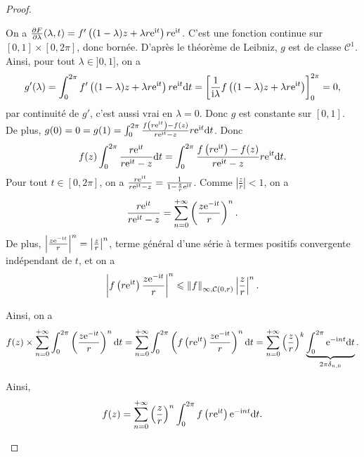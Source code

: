 \documentclass[12pt]{article}
\begin{document}
\begin{proof}
\begin{enumerate}
        On a $\frac{\partial F}{\partial \lambda}(\lambda,t)=f'\left((1-\lambda)z+\lambda r\mathrm{e}^{\mathrm{i} t}\right)r\mathrm{e}^{\mathrm{i} t}$. C'est une fonction continue sur $[0,1]\times[0,2\pi]$, donc bornée. D'après le théorème de Leibniz, $g$ est de classe $\mathcal{C}^{1}$. Ainsi, pour tout $\lambda\in]0,1]$, on a 
        \begin{equation}
            g'(\lambda)=\int_{0}^{2\pi}f'\left((1-\lambda)z+\lambda r\mathrm{e}^{\mathrm{i} t}\right)r\mathrm{e}^{\mathrm{i} t}\mathrm{d} t=\left[\frac{1}{\mathrm{i}\lambda}f\left((1-\lambda)z+\lambda r\mathrm{e}^{\mathrm{i} t}\right)\right]_{0}^{2\pi}=0,
        \end{equation}
        par continuité de $g'$, c'est aussi vrai en $\lambda=0$. Donc $g$ est constante sur $[0,1]$. De plus, $g(0)=0=g(1)=\int_{0}^{2\pi}\frac{f\left(r\mathrm{e}^{\mathrm{i} t}\right)-f(z)}{r\mathrm{e}^{\mathrm{i} t}-z}r\mathrm{e}^{\mathrm{i} t}\mathrm{d} t$. Donc 
        \begin{equation}
            f(z)\int_{0}^{2\pi}\frac{r\mathrm{e}^{\mathrm{i} t}}{r\mathrm{e}^{\mathrm{i} t}-z}\mathrm{d} t=\int_{0}^{2\pi}\frac{f\left(r\mathrm{e}^{\mathrm{i} t}\right)-f(z)}{r\mathrm{e}^{\mathrm{i} t}-z}r\mathrm{e}^{\mathrm{i} t}\mathrm{d} t.
        \end{equation}
        Pour tout $t\in[0,2\pi]$, on a $\frac{r\mathrm{e}^{\mathrm{i} t}}{r\mathrm{e}^{\mathrm{i} t}-z}=\frac{1}{1-\frac{z}{r}\mathrm{e}^{\mathrm{i} t}}$. Comme $\left\lvert\frac{z}{r}\right\rvert<1$, on a 
        \begin{equation}
            \frac{r\mathrm{e}^{\mathrm{i} t}}{r\mathrm{e}^{\mathrm{i} t}-z}=\sum_{n=0}^{+\infty}\left(\frac{z\mathrm{e}^{-\mathrm{i} t}}{r}\right)^{n}.
        \end{equation}
        De plus, $\left\lvert \frac{z\mathrm{e}^{-\mathrm{i} t}}{r}\right\rvert^{n}=\left\lvert\frac{z}{r}\right\rvert^{n}$, terme général d'une série à termes positifs convergente indépendant de $t$, et on a 
        \begin{equation}
            \left\lvert f\left(r\mathrm{e}^{\mathrm{i} t}\right)\frac{z\mathrm{e}^{-\mathrm{i} t}}{r}\right\rvert^{n}\leqslant\left\lVert f\right\rVert_{\infty,\mathcal{C}(0,r)}\left\lvert\frac{z}{r}\right\rvert^{n}.
        \end{equation}

        Ainsi, on a 
        \begin{equation}
            f(z)\times\sum_{n=0}^{+\infty}\int_{0}^{2\pi}\left(\frac{z\mathrm{e}^{-\mathrm{i} t}}{r}\right)^{n}\mathrm{d} t=\sum_{n=0}^{+\infty}\int_{0}^{2\pi}\left(f\left(r\mathrm{e}^{\mathrm{i} t}\right)\frac{z\mathrm{e}^{-\mathrm{i} t}}{r}\right)^{n}\mathrm{d} t=\sum_{n=0}^{+\infty}\left(\frac{z}{r}\right)^{k}\underbrace{\int_{0}^{2\pi}\mathrm{e}^{-\mathrm{i} nt}\mathrm{d} t}_{2\pi\delta_{n,0}}.
        \end{equation}

        Ainsi,
        \begin{equation}
            f(z)=\sum_{n=0}^{+\infty}\left(\frac{z}{r}\right)^{n}\int_{0}^{2\pi}f\left(r\mathrm{e}^{\mathrm{i} t}\right)\mathrm{e}^{-\mathrm{i} nt}\mathrm{d} t.
        \end{equation}


\end{enumerate}
\end{proof}
\end{document}
